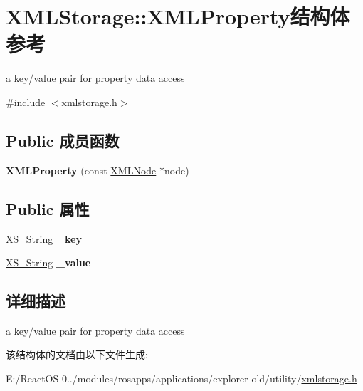\hypertarget{struct_x_m_l_storage_1_1_x_m_l_property}{}\section{X\+M\+L\+Storage\+:\+:X\+M\+L\+Property结构体 参考}
\label{struct_x_m_l_storage_1_1_x_m_l_property}


a key/value pair for property data access  




{\ttfamily \#include $<$xmlstorage.\+h$>$}

\subsection*{Public 成员函数}
\begin{DoxyCompactItemize}
\item 
\mbox{\label{struct_x_m_l_storage_1_1_x_m_l_property_a85981ac47902c6fe7fa56affb46aa85e}} 
{\bfseries X\+M\+L\+Property} (const \hyperlink{struct_x_m_l_storage_1_1_x_m_l_node}{X\+M\+L\+Node} $\ast$node)
\end{DoxyCompactItemize}
\subsection*{Public 属性}
\begin{DoxyCompactItemize}
\item 
\mbox{\label{struct_x_m_l_storage_1_1_x_m_l_property_a06aa2abbfb677d42470564c6875414d0}} 
\hyperlink{struct_x_m_l_storage_1_1_x_s___string}{X\+S\+\_\+\+String} {\bfseries \+\_\+key}
\item 
\mbox{\label{struct_x_m_l_storage_1_1_x_m_l_property_a49af06cdb90b230462d8f785320bb673}} 
\hyperlink{struct_x_m_l_storage_1_1_x_s___string}{X\+S\+\_\+\+String} {\bfseries \+\_\+value}
\end{DoxyCompactItemize}


\subsection{详细描述}
a key/value pair for property data access 

该结构体的文档由以下文件生成\+:\begin{DoxyCompactItemize}
\item 
E\+:/\+React\+O\+S-\/0../modules/rosapps/applications/explorer-\/old/utility/\hyperlink{xmlstorage_8h}{xmlstorage.\+h}\end{DoxyCompactItemize}
